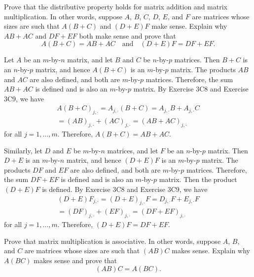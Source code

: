 \begin{exc}
\begin{exercise}
Prove that the distributive property holds for matrix addition and matrix
multiplication. In other words, suppose $A$, $B$, $C$, $D$, $E$, and $F$ are
matrices whose sizes are such that $A(B+C)$ and $(D+E)F$ make sense. Explain
why $AB+AC$ and $DF+EF$ both make sense and prove that
\[ A(B+C) = AB+AC \quad\text{and}\quad (D+E)F = DF+EF. \]
\end{exercise}
\begin{solution}
Let $A$ be an $m$-by-$n$ matrix, and let $B$ and $C$ be $n$-by-$p$ matrices.
Then $B+C$ is an $n$-by-$p$ matrix, and hence $A(B+C)$ is an $m$-by-$p$
matrix. The products $AB$ and $AC$ are also defined, and both are $m$-by-$p$
matrices. Therefore, the sum $AB+AC$ is defined and is also an $m$-by-$p$
matrix. By Exercise 3C8 and Exercise 3C9, we have
\begin{multline*}
A(B+C)_{j,\cdot} = A_{j,\cdot}(B+C) = A_{j,\cdot}B+A_{j,\cdot}C\\
  = (AB)_{j,\cdot}+(AC)_{j,\cdot} = (AB+AC)_{j,\cdot}
\end{multline*}
for all $j=1,\dots,m$. Therefore, $A(B+C)=AB+AC$.

Similarly, let $D$ and $E$ be $m$-by-$n$ matrices, and let $F$ be an $n$-by-$p$
matrix. Then $D+E$ is an $m$-by-$n$ matrix, and hence $(D+E)F$ is an
$m$-by-$p$ matrix. The products $DF$ and $EF$ are also defined, and both are
$m$-by-$p$ matrices. Therefore, the sum $DF+EF$ is defined and is also an
$m$-by-$p$ matrix. Then the product $(D+E)F$ is defined. By Exercise 3C8 and
Exercise 3C9, we have
\begin{multline*}
(D+E)F_{j,\cdot} = (D+E)_{j,\cdot}F = D_{j,\cdot}F+E_{j,\cdot}F\\
  = (DF)_{j,\cdot}+(EF)_{j,\cdot} = (DF+EF)_{j,\cdot}
\end{multline*}
for all $j=1,\dots,m$. Therefore, $(D+E)F=DF+EF$.
\end{solution}

\begin{exercise}
Prove that matrix multiplication is associative. In other words, suppose $A$,
$B$, and $C$ are matrices whose sizes are such that $(AB)C$ makes sense.
Explain why $A(BC)$ makes sense and prove that
\[ (AB)C = A(BC). \]
\end{exercise}
\begin{solution}


\end{solution}
\end{exc}
